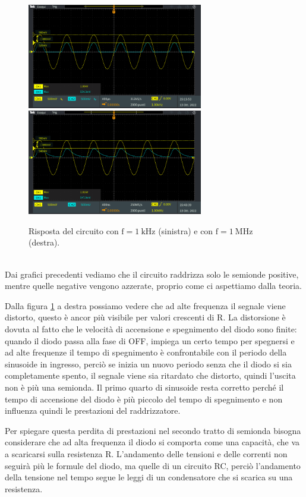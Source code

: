 \documentclass{report}
\begin{document}
\begin{figure}[h!]
\centering
\includegraphics[height=4.6cm]{immagini/TEK00000}
\includegraphics[height=4.6cm]{immagini/TEK00007}
\caption{Risposta del circuito con $\mathrm{f=\SI{1}{k\hertz}}$ (sinistra) e con $\mathrm{f=\SI{1}{M\hertz}}$ (destra).}
	\label{figura:freq}
\end{figure}
\\Dai grafici precedenti vediamo che il circuito raddrizza solo le semionde positive, mentre quelle negative vengono azzerate, proprio come ci aspettiamo dalla teoria. \par
Dalla figura \ref{figura:freq} a destra possiamo vedere che ad alte frequenza il segnale viene distorto, questo è ancor più visibile per valori crescenti di R. La distorsione è dovuta al fatto che le velocità di accensione e spegnimento del diodo sono finite: quando il diodo passa alla fase di OFF, impiega un certo tempo per spegnersi e ad alte frequenze il tempo di spegnimento è confrontabile con il periodo della sinusoide in ingresso, perciò se inizia un nuovo periodo senza che il diodo si sia completamente spento, il segnale viene sia ritardato che distorto, quindi l'uscita non è più una semionda. Il primo quarto di sinusoide resta corretto perché il tempo di accensione del diodo è più piccolo del tempo di spegnimento e non influenza quindi le prestazioni del raddrizzatore. \par
Per spiegare questa perdita di prestazioni nel secondo tratto di semionda bisogna considerare che ad alta frequenza il diodo si comporta come una capacità, che va a scaricarsi sulla resistenza R. L'andamento delle tensioni e delle correnti non seguirà più le formule del diodo, ma quelle di un circuito RC, perciò l'andamento della tensione nel tempo segue le leggi di un condensatore che si scarica su una resistenza.\par
\end{document}

